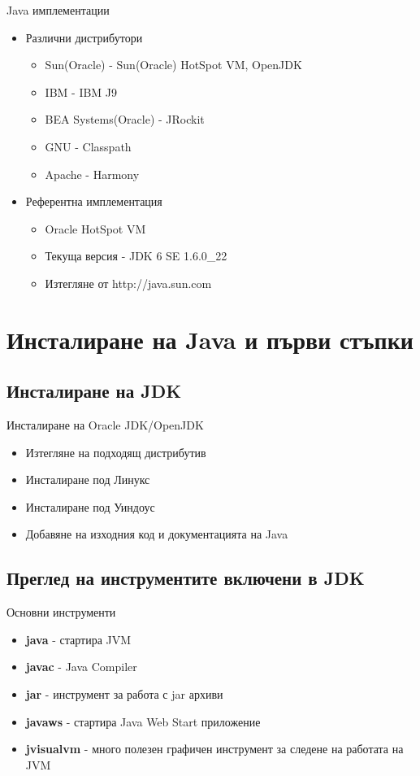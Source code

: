 \documentclass{beamer}
\begin{document}
\begin{frame}{Java имплементации}
  \transdissolve
  \begin{itemize}
  \item Различни дистрибутори
    \begin{itemize}
      \item Sun(Oracle) - Sun(Oracle) HotSpot VM, OpenJDK
      \item IBM - IBM J9
      \item BEA Systems(Oracle) - JRockit
      \item GNU - Classpath
      \item Apache - Harmony
    \end{itemize}
    \pause
  \item Референтна имплементация
    \begin{itemize}
      \item Oracle HotSpot VM
      \item Текуща версия - JDK 6 SE 1.6.0\_22
      \item Изтегляне от http://java.sun.com
    \end{itemize}
  \end{itemize}
\end{frame}

\section{Инсталиране на Java и първи стъпки}
\subsection{Инсталиране на JDK}
\begin{frame}{Инсталиране на Oracle JDK/OpenJDK}
  \transdissolve  
  \begin{itemize}
    \item Изтегляне на подходящ дистрибутив
    \item Инсталиране под Линукс
    \item Инсталиране под Уиндоус
    \item Добавяне на изходния код и
      документацията на Java
  \end{itemize}
\end{frame}

\subsection{Преглед на инструментите включени в JDK}
\begin{frame}{Основни инструменти}
  \transdissolve  
  \begin{itemize}
    \item \textbf{java} - стартира JVM
    \item \textbf{javac} - Java Compiler
    \item \textbf{jar} - инструмент за работа с jar архиви
    \item \textbf{javaws} - стартира Java Web Start
    приложение
    \item \textbf{jvisualvm} - много
    полезен графичен инструмент за следене на работата на JVM
  \end{itemize}
\end{frame}
\end{document}
